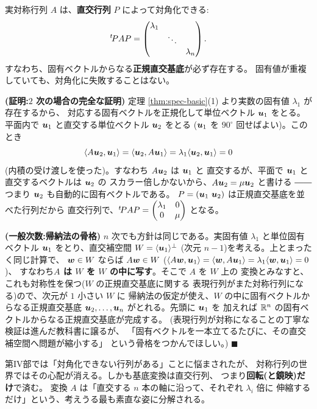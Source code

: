 \begin{teiri}[実対称行列のスペクトル定理]\label{thm:spec-main}
実対称行列 $A$ は、\textbf{直交行列} $P$ によって対角化できる:
\[
{}^t\!P A P = \begin{pmatrix}\lambda_1 & & \\ & \ddots & \\ & & \lambda_n\end{pmatrix}.
\]
すなわち、固有ベクトルからなる\textbf{正規直交基底}が必ず存在する。
固有値が重複していても、対角化に失敗することはない。
\end{teiri}

\noindent\textbf{(証明:$2$ 次の場合の完全な証明)}\quad
定理 \ref{thm:spec-basic}(1) より実数の固有値 $\lambda_1$ が存在するから、
対応する固有ベクトルを正規化して単位ベクトル $\bm{u}_1$ をとる。
平面内で $\bm{u}_1$ と直交する単位ベクトル $\bm{u}_2$ をとる
($\bm{u}_1$ を $90^\circ$ 回せばよい)。このとき
\[
\langle A\bm{u}_2, \bm{u}_1 \rangle
= \langle \bm{u}_2, A\bm{u}_1 \rangle
= \lambda_1 \langle \bm{u}_2, \bm{u}_1 \rangle = 0
\]
(内積の受け渡しを使った)。すなわち $A\bm{u}_2$ は $\bm{u}_1$ と
直交するが、平面で $\bm{u}_1$ と直交するベクトルは $\bm{u}_2$ の
スカラー倍しかないから、$A\bm{u}_2 = \mu\bm{u}_2$ と書ける
――つまり $\bm{u}_2$ も自動的に固有ベクトルである。
$P = (\bm{u}_1\ \bm{u}_2)$ は正規直交基底を並べた行列だから
直交行列で、${}^t\!PAP = \begin{pmatrix}\lambda_1 & 0 \\ 0 & \mu\end{pmatrix}$ となる。

\noindent\textbf{(一般次数:帰納法の骨格)}\quad
$n$ 次でも方針は同じである。実固有値 $\lambda_1$ と単位固有ベクトル
$\bm{u}_1$ をとり、直交補空間 $W = \langle \bm{u}_1 \rangle^{\perp}$
(次元 $n - 1$)を考える。上とまったく同じ計算で、
$\bm{w} \in W$ ならば $A\bm{w} \in W$
($\langle A\bm{w}, \bm{u}_1 \rangle = \langle \bm{w}, A\bm{u}_1 \rangle
= \lambda_1\langle \bm{w}, \bm{u}_1 \rangle = 0$)、
すなわち\textbf{$A$ は $W$ を $W$ の中に写す}。そこで $A$ を $W$ 上の
変換とみなすと、これも対称性を保つ($W$ の正規直交基底に関する
表現行列がまた対称行列になる)ので、次元が $1$ 小さい $W$ に
帰納法の仮定が使え、$W$ の中に固有ベクトルからなる正規直交基底
$\bm{u}_2, \dots, \bm{u}_n$ がとれる。先頭に $\bm{u}_1$ を
加えれば $\mathbb{R}^n$ の固有ベクトルからなる正規直交基底が完成する。
(表現行列が対称になることの丁寧な検証は進んだ教科書に譲るが、
「固有ベクトルを一本立てるたびに、その直交補空間へ問題が縮小する」
という骨格をつかんでほしい。) $\blacksquare$

第IV部では「対角化できない行列がある」ことに悩まされたが、
対称行列の世界ではその心配が消える。しかも基底変換は直交行列、
つまり\textbf{回転(と鏡映)だけ}で済む。
変換 $A$ は「直交する $n$ 本の軸に沿って、それぞれ $\lambda_i$ 倍に
伸縮するだけ」という、考えうる最も素直な姿に分解される。

